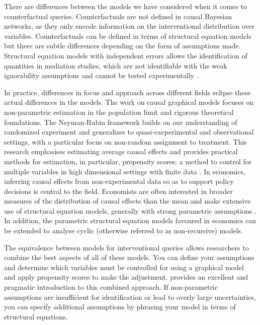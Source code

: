 \documentclass[11pt,a4paper]{article}
\begin{document}
There are differences between the models we have considered when it comes to counterfactual queries. Counterfactuals are not defined in causal Bayesian networks, as they only encode information on the interventional distribution over variables.  Counterfactuals can be defined in terms of structural equation models \cite{Pearl2000} but there are subtle differences depending on the form of assumptions made. Structural equation models with independent errors allows the identification of quantities in mediation studies, which are not identifiable with the weak ignorability assumptions and cannot be tested experimentally \cite{Richardson2013}.  

In practice, differences in focus and approach across different fields eclipse these actual differences in the models. The work on causal graphical models \cite{Pearl2000,Sprites} focuses on non-parametric estimation in the population limit and rigorous theoretical foundations. The Neyman-Rubin framework builds on our understanding of randomized experiment and generalizes to quasi-exeperimental and observational settings, with a particular focus on non-random assignment to treatment. This research emphasises estimating average causal effects and provides practical methods for estimation, in particular, propensity scores; a method to control for multiple variables in high dimensional settings with finite data \cite{Rosenbaum1983}. In economics, inferring causal effects from non-experimental data so as to support policy decisions is central to the field. Economists are often interested in broader measures of the distribution of causal effects than the mean and make extensive use of structural equation models, generally with strong parametric assumptions \cite{Heckman2008}. In addition, the parametric structural equation models favoured in economics can be extended to analyse cyclic (otherwise referred to as non-recursive) models. 

The equivalence between models for interventional queries allows researchers to combine the best aspects of all of these models. You can define your assumptions and determine which variables must be controlled for using a graphical model and apply propensity scores to make the adjustment. \cite{Morgan2007} provides an excellent and pragmatic introduction to this combined approach. If non-parametric assumptions are insufficient for identification or lead to overly large uncertainties, you can specify additional assumptions by phrasing your model in terms of structural equations. 
\end{document}
